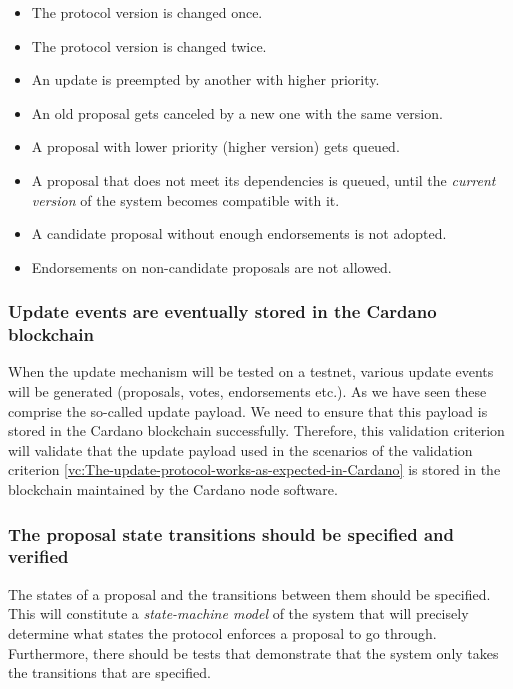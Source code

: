 \begin{itemize}
	\item The protocol version is changed once.
	\item The protocol version is changed twice.
	\item An update is preempted by another with higher priority.
	\item An old proposal gets canceled by a new one with the same version.
	\item A proposal with lower priority (higher version) gets queued.
	\item A proposal that does not meet its dependencies is	queued, until the
	\emph{current version} of the system becomes compatible with it.
	\item A candidate proposal without enough endorsements is not adopted.
	\item Endorsements on non-candidate proposals are not allowed.
\end{itemize}


\subsubsection{Update events are eventually stored in the Cardano
	blockchain}\label{vc:Update_events_are_stored_in_the_Cardano_blockchain}
When the update mechanism will be tested on a testnet, various update events 
will be 
generated (proposals, votes, endorsements etc.). As we have seen these comprise 
the so-called update payload. We need to ensure that this payload is stored in 
the Cardano blockchain successfully. Therefore, this validation criterion will 
validate that the update payload used in the
scenarios of the
validation criterion
\ref{vc:The-update-protocol-works-as-expected-in-Cardano} is stored in the
blockchain maintained by the Cardano node software.

\subsubsection{The proposal state transitions should be specified and
	verified}\label{vc:The_proposal_state_transitions_should_be_specified_and_verified}

The states of a proposal and the transitions between them should be specified.
This will constitute a \emph{state-machine model} of the system that will
precisely determine what states the protocol enforces a proposal to go through.
Furthermore, there should be tests that demonstrate that the system only takes
the transitions that are specified.

